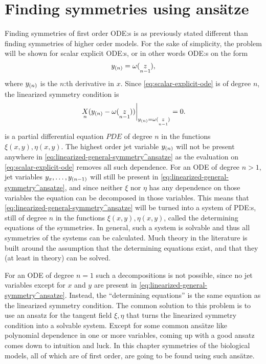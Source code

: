 \chapter{Finding symmetries using ansätze} \label{ch:ansatze}

Finding symmetries of first order ODE:s is as previously stated different than finding symmetries of higher order models.
For the sake of simplicity, the problem will be shown for scalar explicit ODE:s, or in other words ODE:s on the form
\begin{equation} \label{eq:scalar-explicit-ode}
  \prolongpart{y}{n} = \omega(\prolong{z}{n-1}),
\end{equation}
where \(\prolongpart{y}{n}\) is the \(n\):th derivative in \(x\).
Since \cref{eq:scalar-explicit-ode} is of degree \(n\), the linearized symmetry condition is
\begin{equation} \label{eq:linearized-general-symmetry^ansatze}
  \eval{\prolong{X}{n}(\prolongpart{y}{n} - \omega(\prolong{z}{n-1}))}_{\prolongpart{y}{n} = \omega(\prolong{z}{n-1})} = 0.
\end{equation}
 is a partial differential equation \(PDE\) of degree \(n\) in the functions \(\xi(x, y), \eta(x, y)\).
The highest order jet variable \(\prolongpart{y}{n}\) will not be present anywhere in \cref{eq:linearized-general-symmetry^ansatze} as the evaluation on \cref{eq:scalar-explicit-ode} removes all such dependence.
For an ODE of degree \(n > 1\), jet variables \(y_x, \dots, \prolongpart{y}{n-1}\) will still be present in \cref{eq:linearized-general-symmetry^ansatze}, and since neither \(\xi\) nor \(\eta\) has any dependence on those variables the equation can be decomposed in those variables.
This means that \cref{eq:linearized-general-symmetry^ansatze} will be turned into a system of PDE:s, still of degree \(n\) in the functions \(\xi(x, y), \eta(x, y)\), called the determining equations of the symmetries.
In general, such a system is solvable and thus all symmetries of the systems can be calculated.
Much theory in the literature is built around the assumption that the determining equations exist, and that they (at least in theory) can be solved.

For an ODE of degree \(n = 1\) such a decompositions is not possible, since no jet variables except for \(x\) and \(y\) are present in \cref{eq:linearized-general-symmetry^ansatze}.
Instead, the \enquote{determining equations} is the same equation as the linearized symmetry condition.
The common solution to this problem is to use an ansatz for the tangent field \(\xi, \eta\) that turns the linearized symmetry condition into a solvable system.
Except for some common ansätze like polynomial dependence in one or more variables, coming up with a good ansatz comes down to intuition and luck.
In this chapter symmetries of the biological models, all of which are of first order, are going to be found using such ansätze.

